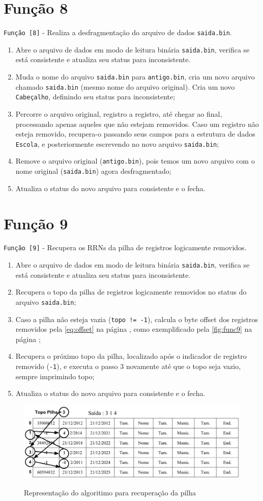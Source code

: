 \documentclass[
	12pt,				%
	openany,			%
	twoside,			%
	a4paper,			%
	english,			%
	french,				%
	spanish,			%
	brazil,				%
	]{abntex2}
\begin{document}
\section{Função 8}
\verb|Função [8]| - Realiza a desfragmentação do arquivo de dados \verb|saida.bin|.
\begin{enumerate}
    \item Abre o arquivo de dados em modo de leitura binária \verb|saida.bin|, verifica se está consistente e atualiza seu status para inconsistente.
    \item Muda o nome do arquivo \verb|saida.bin| para \verb|antigo.bin|, cria um novo arquivo chamado \verb|saida.bin| (mesmo nome do arquivo original). Cria um novo \verb|Cabeçalho|, definindo seu status para inconsistente;
    \item Percorre o arquivo original, registro a registro, até chegar ao final, processando apenas aqueles que não estejam removidos. Caso um registro não esteja removido, recupera-o passando seus campos para a estrutura de dados \verb|Escola|, e posteriormente escrevendo no novo arquivo \verb|saida.bin|;
    \item Remove o arquivo original (\verb|antigo.bin|), pois temos um novo arquivo com o nome original (\verb|saida.bin|) agora desfragmentado;
    \item Atualiza o status do novo arquivo para consistente e o fecha.
\end{enumerate}

\section{Função 9}
\verb|Função [9]| - Recupera os RRNs da pilha de registros logicamente removidos.
\begin{enumerate}
    \item Abre o arquivo de dados em modo de leitura binária \verb|saida.bin|, verifica se está consistente e atualiza seu status para inconsistente.
    \item Recupera o topo da pilha de registros logicamente removidos no status do arquivo \verb|saida.bin|;
    \item Caso a pilha não esteja vazia (\verb|topo != -1|), calcula o byte offset dos registros removidos pela \autoref{eq:offset} na página \pageref{eq:offset}, como exemplificado pela \autoref{fig:func9} na página \pageref{fig:func9};
    \item Recupera o próximo topo da pilha, localizado após o indicador de registro removido (\verb|-1|), e executa o passo 3 novamente até que o topo seja vazio, sempre imprimindo topo;
    \item Atualiza o status do novo arquivo para consistente e o fecha.
\end{enumerate}

\begin{figure}[h]
    \centering
    \caption{Representação do algoritimo para recuperação da pilha}
    \includegraphics[width=\textwidth]{func9.png}
    \label{fig:func9}
\end{figure}
\end{document}
